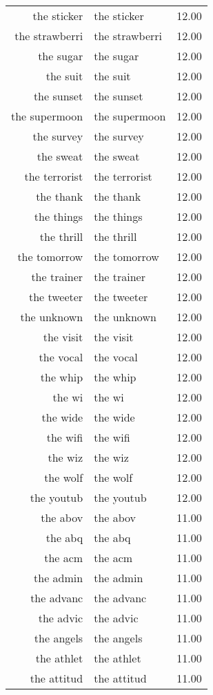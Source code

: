 \begin{table}[ht]
\begin{tabular}{rlr}
  the sticker & the sticker & 12.00 \\ 
  the strawberri & the strawberri & 12.00 \\ 
  the sugar & the sugar & 12.00 \\ 
  the suit & the suit & 12.00 \\ 
  the sunset & the sunset & 12.00 \\ 
  the supermoon & the supermoon & 12.00 \\ 
  the survey & the survey & 12.00 \\ 
  the sweat & the sweat & 12.00 \\ 
  the terrorist & the terrorist & 12.00 \\ 
  the thank & the thank & 12.00 \\ 
  the things & the things & 12.00 \\ 
  the thrill & the thrill & 12.00 \\ 
  the tomorrow & the tomorrow & 12.00 \\ 
  the trainer & the trainer & 12.00 \\ 
  the tweeter & the tweeter & 12.00 \\ 
  the unknown & the unknown & 12.00 \\ 
  the visit & the visit & 12.00 \\ 
  the vocal & the vocal & 12.00 \\ 
  the whip & the whip & 12.00 \\ 
  the wi & the wi & 12.00 \\ 
  the wide & the wide & 12.00 \\ 
  the wifi & the wifi & 12.00 \\ 
  the wiz & the wiz & 12.00 \\ 
  the wolf & the wolf & 12.00 \\ 
  the youtub & the youtub & 12.00 \\ 
  the abov & the abov & 11.00 \\ 
  the abq & the abq & 11.00 \\ 
  the acm & the acm & 11.00 \\ 
  the admin & the admin & 11.00 \\ 
  the advanc & the advanc & 11.00 \\ 
  the advic & the advic & 11.00 \\ 
  the angels & the angels & 11.00 \\ 
  the athlet & the athlet & 11.00 \\ 
  the attitud & the attitud & 11.00 \\ 

\end{tabular}
\end{table}
